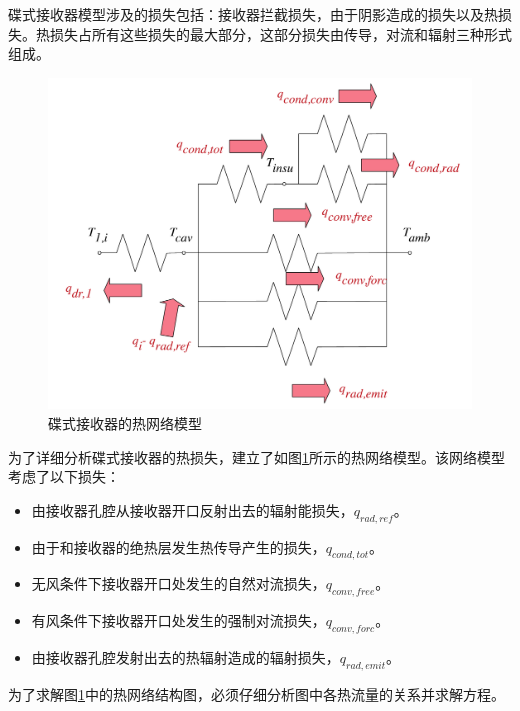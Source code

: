 碟式接收器模型涉及的损失包括：接收器拦截损失，由于阴影造成的损失以及热损失。热损失占所有这些损失的最大部分，这部分损失由传导，对流和辐射三种形式组成。
\noindent \begin{figure}[ht!]
\begin{center}
	\includegraphics[width = 0.5\columnwidth]{fig/thermalLosses.pdf}
	\caption{碟式接收器的热网络模型}
	\label{fig:thermal-lose}
\end{center}
\end{figure}
为了详细分析碟式接收器的热损失，建立了如图\ref{fig:thermal-lose}所示的热网络模型。该网络模型考虑了以下损失：
\begin{itemize}
	\item 由接收器孔腔从接收器开口反射出去的辐射能损失，$q_{rad,ref}$。
	\item 由于和接收器的绝热层发生热传导产生的损失，$q_{cond,tot}$。
	\item 无风条件下接收器开口处发生的自然对流损失，$q_{conv,free}$。
	\item 有风条件下接收器开口处发生的强制对流损失，$q_{conv,forc}$。
	\item 由接收器孔腔发射出去的热辐射造成的辐射损失，$q_{rad,emit}$。
\end{itemize}

为了求解图\ref{fig:thermal-lose}中的热网络结构图，必须仔细分析图中各热流量的关系并求解方程。

